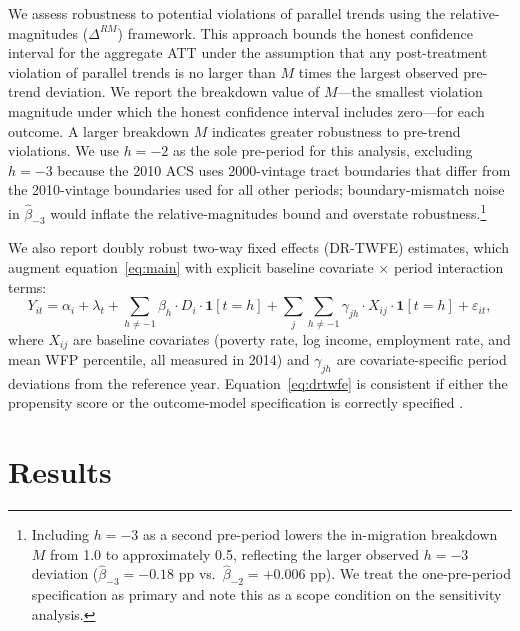 \documentclass[12pt]{article}
\begin{document}
We assess robustness to potential violations of parallel trends
using the \citet{rambachan2023more} relative-magnitudes ($\Delta^{RM}$)
framework.
This approach bounds the honest confidence interval for the aggregate ATT
under the assumption that any post-treatment violation of parallel trends
is no larger than $M$ times the largest observed pre-trend deviation.
We report the breakdown value of $M$---the smallest violation magnitude
under which the honest confidence interval includes zero---for each outcome.
A larger breakdown $M$ indicates greater robustness to pre-trend violations.
We use $h = -2$ as the sole pre-period for this analysis, excluding
$h = -3$ because the 2010 ACS uses 2000-vintage tract boundaries
that differ from the 2010-vintage boundaries used for all other periods;
boundary-mismatch noise in $\hat{\beta}_{-3}$ would inflate the
relative-magnitudes bound and overstate robustness.\footnote{%
  Including $h = -3$ as a second pre-period lowers the in-migration
  breakdown $M$ from 1.0 to approximately 0.5, reflecting the larger
  observed $h = -3$ deviation ($\hat{\beta}_{-3} = -0.18$ pp vs.\
  $\hat{\beta}_{-2} = +0.006$ pp).
  We treat the one-pre-period specification as primary and note this
  as a scope condition on the sensitivity analysis.}

We also report doubly robust two-way fixed effects (DR-TWFE) estimates,
which augment equation~\eqref{eq:main} with explicit baseline covariate
$\times$ period interaction terms:
\begin{equation}
  Y_{it} = \alpha_i + \lambda_t
    + \sum_{h \neq -1} \beta_h \cdot D_i \cdot \mathbf{1}[t = h]
    + \sum_{j} \sum_{h \neq -1} \gamma_{jh} \cdot X_{ij} \cdot \mathbf{1}[t = h]
    + \varepsilon_{it},
  \label{eq:drtwfe}
\end{equation}
where $X_{ij}$ are baseline covariates (poverty rate, log income,
employment rate, and mean WFP percentile, all measured in 2014)
and $\gamma_{jh}$ are covariate-specific period deviations from the
reference year.
Equation~\eqref{eq:drtwfe} is consistent if either the propensity score
or the outcome-model specification is correctly specified
\citep{callaway2021difference}.


\section{Results}
\label{sec:results}
\end{document}
